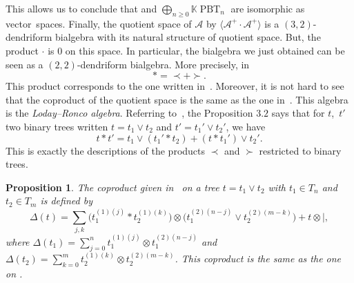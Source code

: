 \documentclass[10pt,a4paper]{amsart}
\numberwithin{equation}{section}
\theoremstyle{definition}
\theoremstyle{plain}
\newtheorem{Prop}[defi]{Proposition}
\newcommand{\K}{\mathbb{K}}
\DeclareMathOperator{\PBT}{PBT}
\begin{document}
This allows us to conclude that  and $ \bigoplus_{n\geq 0} \K\PBT_n$ are isomorphic as vector~spaces.
Finally, the quotient space of $\mathcal{A}$ by $\big\langle \mathcal{A}^+\cdot \mathcal{A}^+ \big\rangle$ is a $(3,2)$-dendriform bialgebra with its natural structure of quotient space. But, the product $\cdot$ is $0$ on this space. In particular, the bialgebra we just obtained can be seen as a $(2,2)$-dendriform bialgebra. More precisely, in 
\[
	*=\prec+\succ.
\]
This product corresponds to the one written in~\cite[Proposition 3.2]{LR}. Moreover, it is not hard to see that the coproduct of the quotient space is the same as the one in~\cite[Proposition~3.3]{Eclair}. This algebra is the \emph{Loday--Ronco algebra}.
Referring to~\cite{LR}, the Proposition $3.2$ says that for $t$,~$t'$ two binary trees written $t=t_1\vee t_2$ and $t'=t_1'\vee t_2'$, we have
\[
t*t'=t_1\vee (t_1'*t_2)+(t*t_1')\vee t_2'.
\]
This is exactly the descriptions of the products $\prec$ and $\succ$ restricted to binary trees.
\begin{Prop}
The coproduct given in~{\rm \cite{LR}} on a tree $t=t_1\vee t_2$ with $t_1\in T_n$ and $t_2\in T_m$ is defined by
	\begin{equation*}
		\Delta(t)=\sum_{j,k}\big( t_1^{(1)(j)}* t_2^{(1)(k)} \big)\otimes \big( t_1^{(2)(n-j)}\vee t_2^{(2)(m-k)} \big)+t\otimes |,
	\end{equation*}
	where $ \Delta(t_1)=\sum_{j=0}^n t_1^{(1)(j)}\otimes t_1^{(2)(n-j)}$ and $ \Delta(t_2)=\sum_{k=0}^m t_2^{(1)(k)}\otimes t_2^{(2)(m-k)}$.
	This coproduct is the same as the one on .
\end{Prop}
\end{document}
